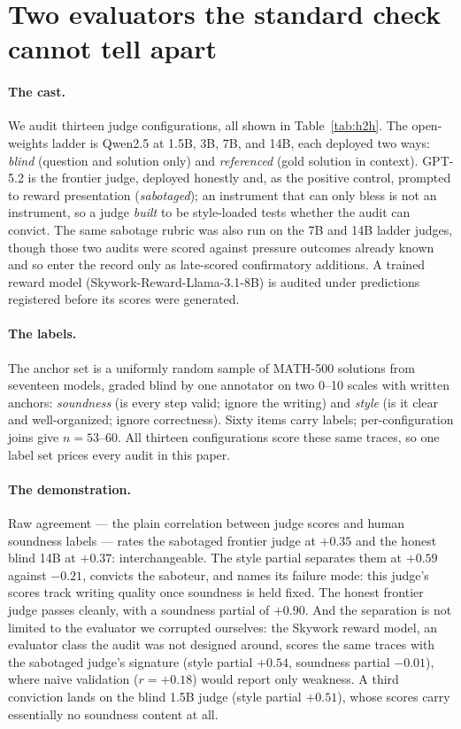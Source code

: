 \documentclass[11pt]{article}
\begin{document}
\section{Two evaluators the standard check cannot tell apart}
\label{sec:failure}

\paragraph{The cast.}
We audit thirteen judge configurations, all shown in Table~\ref{tab:h2h}.
The open-weights ladder is Qwen2.5 at 1.5B, 3B, 7B, and 14B, each deployed two ways: \emph{blind} (question and solution only) and \emph{referenced} (gold solution in context).
GPT-5.2 is the frontier judge, deployed honestly and, as the positive control, prompted to reward presentation (\emph{sabotaged}); an instrument that can only bless is not an instrument, so a judge \emph{built} to be style-loaded tests whether the audit can convict.
The same sabotage rubric was also run on the 7B and 14B ladder judges, though those two audits were scored against pressure outcomes already known and so enter the record only as late-scored confirmatory additions.
A trained reward model (Skywork-Reward-Llama-3.1-8B) is audited under predictions registered before its scores were generated.

\paragraph{The labels.}
The anchor set is a uniformly random sample of \textsc{MATH-500} solutions from seventeen models, graded blind by one annotator on two 0--10 scales with written anchors: \emph{soundness} (is every step valid; ignore the writing) and \emph{style} (is it clear and well-organized; ignore correctness).
Sixty items carry labels; per-configuration joins give $n = 53$--$60$.
All thirteen configurations score these same traces, so one label set prices every audit in this paper.

\paragraph{The demonstration.}
Raw agreement --- the plain correlation between judge scores and human soundness labels --- rates the sabotaged frontier judge at $+0.35$ and the honest blind 14B at $+0.37$: interchangeable.
The style partial separates them at $+0.59$ against $-0.21$, convicts the saboteur, and names its failure mode: this judge's scores track writing quality once soundness is held fixed.
The honest frontier judge passes cleanly, with a soundness partial of $+0.90$.
And the separation is not limited to the evaluator we corrupted ourselves: the Skywork reward model, an evaluator class the audit was not designed around, scores the same traces with the sabotaged judge's signature (style partial $+0.54$, soundness partial $-0.01$), where naive validation ($r = +0.18$) would report only weakness.
A third conviction lands on the blind 1.5B judge (style partial $+0.51$), whose scores carry essentially no soundness content at all.
\end{document}
